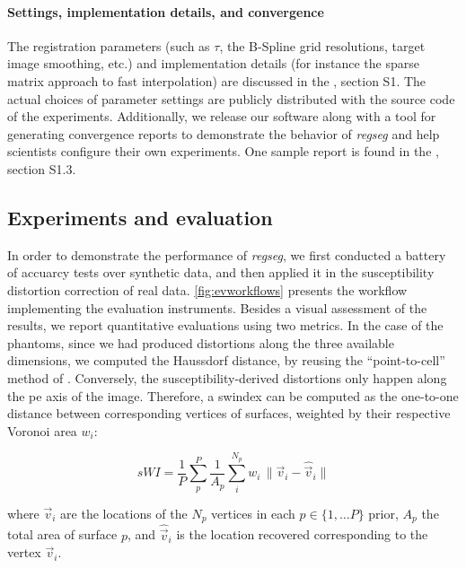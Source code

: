 \paragraph*{Settings, implementation details, and convergence}
\label{sec:conv_report}
The registration parameters (such as $\tau$, the B-Spline grid resolutions,
  target image smoothing, etc.) and implementation details (for instance the sparse matrix approach
  to fast interpolation) are discussed in the \suppl{}, section S1.
The actual choices of parameter settings are publicly distributed with the source code of the experiments.
Additionally, we release our software along with a tool for generating convergence reports to
  demonstrate the behavior of \emph{regseg} and help scientists configure their own experiments.
One sample report is found in the \suppl{}, section S1.3.


\subsection*{Experiments and evaluation}
\label{sec:experiments_evaluation}
%
In order to demonstrate the performance of \emph{regseg}, we first conducted a battery of
  accuarcy tests over synthetic data, and then applied it in the susceptibility distortion
  correction of real data.
\autoref{fig:evworkflows} presents the workflow implementing the evaluation instruments.
Besides a visual assessment of the results, we report quantitative evaluations using
  two metrics.
In the case of the phantoms, since we had produced distortions along the three
  available dimensions, we computed the Haussdorf distance, by reusing the
  ``point-to-cell'' method of \cite{commandeur_vtk_2011}.
Conversely, the susceptibility-derived distortions only happen along the \gls*{pe}
  axis of the image.
Therefore, a \gls*{swindex} can be computed as the one-to-one distance between corresponding
  vertices of surfaces, weighted by their respective Voronoi area $w_i$:

  \begin{equation}
  sWI = \frac{1}{P} \sum\limits_p^P \frac{1}{A_p} \sum\limits_i^{N_p} w_i\,\|
  \vec{v}_i - \hat{\vec{v}}_i \|
  \label{eq:swindex}
  \end{equation}

  where $\vec{v}_i$ are the locations of the $N_p$ vertices in each $p \in \{1, \dots P\}$
  prior, $A_p$ the total area of surface $p$, and $\hat{\vec{v}}_i$ is the location
  recovered corresponding to the vertex $\vec{v}_i$.



